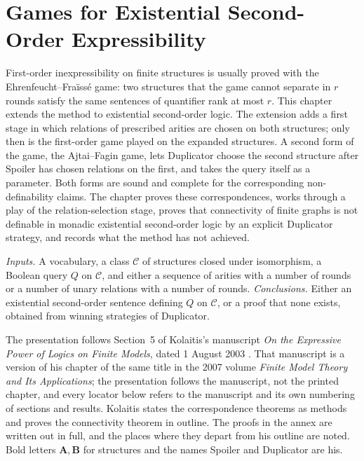 \chapter{Games for Existential Second-Order Expressibility}
\label{sec:p03-w03-p03-058-eso-games}

First-order inexpressibility on finite structures is usually proved with the
Ehrenfeucht--Fra\"iss\'e game: two structures that the game cannot separate
in \(r\) rounds satisfy the same sentences of quantifier rank at most \(r\).
This chapter extends the method to existential second-order logic. The
extension adds a first stage in which relations of prescribed arities are
chosen on both structures; only then is the first-order game played on the
expanded structures. A second form of the game, the Ajtai--Fagin game, lets
Duplicator choose the second structure after Spoiler has chosen relations on
the first, and takes the query itself as a parameter. Both forms are sound
and complete for the corresponding non-definability claims. The chapter
proves these correspondences, works through a play of the relation-selection
stage, proves that connectivity of finite graphs is not definable in monadic
existential second-order logic by an explicit Duplicator strategy, and records
what the method has not achieved.

\emph{Inputs.} A vocabulary, a class \(\mathcal C\) of structures closed
under isomorphism, a Boolean query \(Q\) on \(\mathcal C\), and either a
sequence of arities with a number of rounds or a number of unary relations
with a number of rounds. \emph{Conclusions.} Either an existential
second-order sentence defining \(Q\) on \(\mathcal C\), or a proof that none
exists, obtained from winning strategies of Duplicator.

The presentation follows Section~5 of Kolaitis's manuscript \emph{On the
Expressive Power of Logics on Finite Models}, dated 1 August 2003
\cite[pp.~26--29]{Kolaitis2003ExpressivePowerNotes}. That manuscript is a
version of his chapter of the same title in the 2007 volume \emph{Finite
Model Theory and Its Applications}; the presentation follows the manuscript,
not the printed chapter, and every locator below refers to the manuscript and
its own numbering of sections and results. Kolaitis states the correspondence
theorems as methods and proves the connectivity theorem in outline. The
proofs in the annex are written out in full, and the places where they
depart from his outline are noted. Bold letters \(\mathbf A,\mathbf B\) for
structures and the names Spoiler and Duplicator are his.

